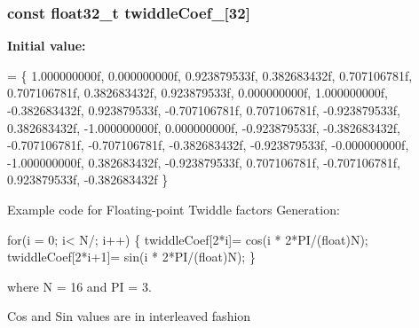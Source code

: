\subsubsection[{\texorpdfstring{twiddle\+Coef\+\_\+16}{twiddleCoef_16}}]{\setlength{\rightskip}{0pt plus 5cm}const float32\+\_\+t twiddle\+Coef\+\_\mbox{[}32\mbox{]}}\hypertarget{group__CFFT__CIFFT_gae75e243ec61706427314270f222e0c8e}{}\label{group__CFFT__CIFFT_gae75e243ec61706427314270f222e0c8e}
{\bfseries Initial value\+:}
\begin{DoxyCode}
= \{
    1.000000000f,  0.000000000f,
    0.923879533f,  0.382683432f,
    0.707106781f,  0.707106781f,
    0.382683432f,  0.923879533f,
    0.000000000f,  1.000000000f,
   -0.382683432f,  0.923879533f,
   -0.707106781f,  0.707106781f,
   -0.923879533f,  0.382683432f,
   -1.000000000f,  0.000000000f,
   -0.923879533f, -0.382683432f,
   -0.707106781f, -0.707106781f,
   -0.382683432f, -0.923879533f,
   -0.000000000f, -1.000000000f,
    0.382683432f, -0.923879533f,
    0.707106781f, -0.707106781f,
    0.923879533f, -0.382683432f
\}
\end{DoxyCode}
\begin{DoxyParagraph}{}
Example code for Floating-\/point Twiddle factors Generation\+: 
\end{DoxyParagraph}
\begin{DoxyParagraph}{}

\begin{DoxyPre}for(i = 0; i< N/; i++)
\{
  twiddleCoef[2*i]= cos(i * 2*PI/(float)N);
  twiddleCoef[2*i+1]= sin(i * 2*PI/(float)N);
\} \end{DoxyPre}
 
\end{DoxyParagraph}
\begin{DoxyParagraph}{}
where N = 16 and PI = 3. 
\end{DoxyParagraph}
\begin{DoxyParagraph}{}
Cos and Sin values are in interleaved fashion 
\end{DoxyParagraph}
